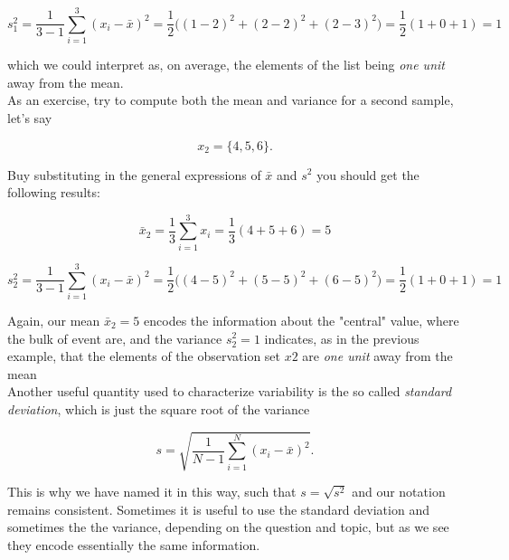 \documentclass{book}
\begin{document}
\begin{equation}
s_{1}^{2} = \frac{1}{3 - 1} \sum_{i = 1}^{3} (x_{i} - \bar{x})^{2} = \frac{1}{2} \big((1 - 2)^{2} + (2 - 2)^{2} + (2 - 3)^{2}\big) = \frac{1}{2} (1 + 0 + 1) = 1 \nonumber
\end{equation}

which we could interpret as, on average, the elements of the list being \textit{one unit} away from the mean.\\

As an exercise, try to compute both the mean and variance for a second sample, let's say

\begin{equation}
x_{2} = \{4, 5, 6\} \nonumber. 
\end{equation}

Buy substituting in the general expressions of $\bar{x}$ and $s^{2}$ you should get the following results: 

\begin{equation}
\bar{x}_{2} = \frac{1}{3} \sum_{i = 1}^{3} x_{i} = \frac{1}{3} (4 + 5 + 6) = 5 \nonumber
\end{equation}

\begin{equation}
s^{2}_{2} = \frac{1}{3 - 1} \sum_{i = 1}^{3} (x_{i} - \bar{x})^{2} = \frac{1}{2} \big((4 - 5)^{2} + (5 - 5)^{2} + (6 - 5)^{2}\big) = \frac{1}{2} (1 + 0 + 1) = 1 \nonumber
\end{equation}

Again, our mean $\bar{x}_{2} = 5$ encodes the information about the "central" value, where the bulk of event are, and the variance $s^{2}_{2} = 1$ indicates, as in the previous example, that the elements of the observation set $x{2}$ are \textit{one unit} away from the mean\\

Another useful quantity used to characterize variability is the so called \textit{standard deviation}, which is just the square root of the variance

\begin{equation}
s = \sqrt{\frac{1}{N - 1} \sum_{i = 1}^{N} (x_{i} - \bar{x})^{2}}. 
\end{equation}

This is why we have named it in this way, such that $s = \sqrt{s^{2}}$ and our notation remains consistent. Sometimes it is useful to use the standard deviation and sometimes the the variance, depending on the question and topic, but as we see they encode essentially the same information. \\
\end{document}
